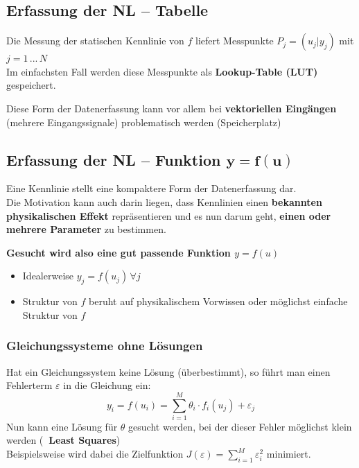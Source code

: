 \subsection{Erfassung der NL -- Tabelle}

Die Messung der statischen Kennlinie von $f$ liefert Messpunkte $P_j = (u_j | y_j)$ mit $j = 1 \, ... \, N$ \\
Im einfachsten Fall werden diese Messpunkte als \textbf{Lookup-Table (LUT)} gespeichert.

\vspace{0.2cm}

Diese Form der Datenerfassung kann vor allem bei \textbf{vektoriellen Eingängen} (mehrere Eingangssignale) problematisch werden (Speicherplatz)


\subsection[Erfassung der NL -- Funktion]{Erfassung der NL -- Funktion $\bm{y = f(u)}$}

Eine Kennlinie stellt eine kompaktere Form der Datenerfassung dar. \\
Die Motivation kann auch darin liegen, dass Kennlinien einen \textbf{bekannten physikalischen Effekt} repräsentieren und es nun darum geht,
\textbf{einen oder mehrere Parameter} zu bestimmen.

\vspace{0.2cm}

\textbf{Gesucht wird also eine \textbf{gut passende Funktion} $y = f(u)$}

\vspace{0.1cm}

\begin{itemize}
	\item Idealerweise $y_j = f(u_j) \, \forall j$
	\item Struktur von $f$ beruht auf physikalischem Vorwissen oder möglichst einfache Struktur von $f$
\end{itemize}


\subsubsection{Gleichungssysteme ohne Lösungen}

Hat ein Gleichungssystem keine Lösung (überbestimmt), so führt man einen Fehlerterm $\varepsilon$ in die Gleichung ein:
$$ y_i = f(u_i) = \sum\limits_{i=1}^M \theta_i \cdot f_i(u_j) + \varepsilon_j $$
Nun kann eine Lösung für $\theta$ gesucht werden, bei der dieser Fehler möglichst klein werden (\textbf{\textrightarrow\ Least Squares}) \\
Beispielsweise wird dabei die Zielfunktion $J(\varepsilon) =  \sum\limits_{i=1}^M \varepsilon_i^2$ minimiert.


